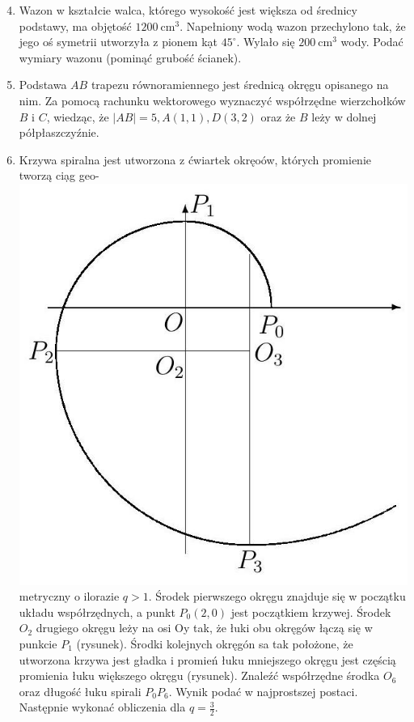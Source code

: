 \documentclass[10pt]{article}
\begin{document}
\begin{enumerate}
  \setcounter{enumi}{3}
  \item Wazon w kształcie walca, którego wysokość jest większa od średnicy podstawy, ma objętość $1200 \mathrm{~cm}^{3}$. Napełniony wodą wazon przechylono tak, że jego oś symetrii utworzyła z pionem kạt $45^{\circ}$. Wylało się $200 \mathrm{~cm}^{3}$ wody. Podać wymiary wazonu (pominąć grubość ścianek).
  \item Podstawa $A B$ trapezu równoramiennego jest średnicą okręgu opisanego na nim. Za pomocą rachunku wektorowego wyznaczyć współrzędne wierzchołków $B$ i $C$, wiedząc, że $|A B|=5, A(1,1), D(3,2)$ oraz że $B$ leży w dolnej półpłaszczyźnie.
  \item Krzywa spiralna jest utworzona z ćwiartek okręoów, których promienie tworzą ciạg geo-\\
\includegraphics[max width=\textwidth, center]{2024_11_16_06775899c7f7a12bc0aag-1}\\
metryczny o ilorazie $q>1$. Środek pierwszego okręgu znajduje się w początku układu współrzędnych, a punkt $P_{0}(2,0)$ jest początkiem krzywej. Środek $O_{2}$ drugiego okręgu leży na osi Oy tak, że łuki obu okręgów łączą się w punkcie $P_{1}$ (rysunek). Środki kolejnych okręgón sa tak położone, że utworzona krzywa jest gładka i promień łuku mniejszego okręgu jest częścią promienia łuku większego okręgu (rysunek). Znaleźć współrzędne środka $O_{6}$ oraz długość łuku spirali $P_{0} P_{6}$. Wynik podać w najprostszej postaci. Następnie wykonać obliczenia dla $q=\frac{3}{2}$.
\end{enumerate}
\end{document}
